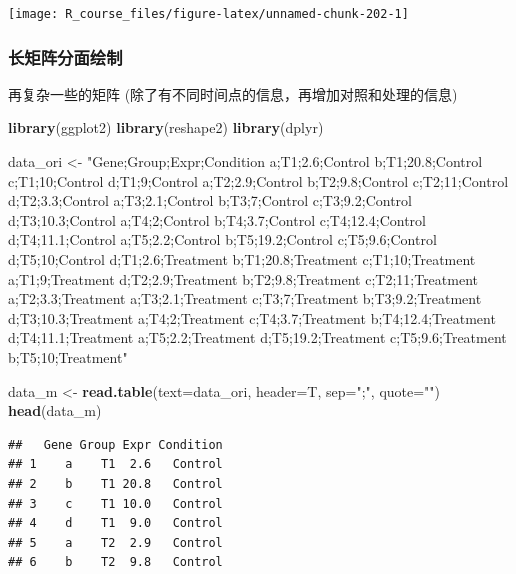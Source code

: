 \documentclass[]{article}
\newenvironment{Shaded}{\begin{snugshade}}{\end{snugshade}}
\newcommand{\KeywordTok}[1]{\textcolor[rgb]{0.13,0.29,0.53}{\textbf{{#1}}}}
\newcommand{\DataTypeTok}[1]{\textcolor[rgb]{0.13,0.29,0.53}{{#1}}}
\newcommand{\StringTok}[1]{\textcolor[rgb]{0.31,0.60,0.02}{{#1}}}
\newcommand{\NormalTok}[1]{{#1}}
\numberwithin{figure}{section}
\numberwithin{table}{section}
\theoremstyle{definition}
\theoremstyle{definition}
\theoremstyle{definition}
\theoremstyle{remark}
\begin{document}
\begin{center}\texttt{[image: R\_course\_files/figure-latex/unnamed-chunk-202-1]} \end{center}

\subsubsection{长矩阵分面绘制}

再复杂一些的矩阵 (除了有不同时间点的信息，再增加对照和处理的信息)

\begin{Shaded}
\begin{Highlighting}[]
\KeywordTok{library}\NormalTok{(ggplot2)}
\KeywordTok{library}\NormalTok{(reshape2)}
\KeywordTok{library}\NormalTok{(dplyr)}

\NormalTok{data_ori <-}\StringTok{ "Gene;Group;Expr;Condition}
\StringTok{a;T1;2.6;Control}
\StringTok{b;T1;20.8;Control}
\StringTok{c;T1;10;Control}
\StringTok{d;T1;9;Control}
\StringTok{a;T2;2.9;Control}
\StringTok{b;T2;9.8;Control}
\StringTok{c;T2;11;Control}
\StringTok{d;T2;3.3;Control}
\StringTok{a;T3;2.1;Control}
\StringTok{b;T3;7;Control}
\StringTok{c;T3;9.2;Control}
\StringTok{d;T3;10.3;Control}
\StringTok{a;T4;2;Control}
\StringTok{b;T4;3.7;Control}
\StringTok{c;T4;12.4;Control}
\StringTok{d;T4;11.1;Control}
\StringTok{a;T5;2.2;Control}
\StringTok{b;T5;19.2;Control}
\StringTok{c;T5;9.6;Control}
\StringTok{d;T5;10;Control}
\StringTok{d;T1;2.6;Treatment}
\StringTok{b;T1;20.8;Treatment}
\StringTok{c;T1;10;Treatment}
\StringTok{a;T1;9;Treatment}
\StringTok{d;T2;2.9;Treatment}
\StringTok{b;T2;9.8;Treatment}
\StringTok{c;T2;11;Treatment}
\StringTok{a;T2;3.3;Treatment}
\StringTok{a;T3;2.1;Treatment}
\StringTok{c;T3;7;Treatment}
\StringTok{b;T3;9.2;Treatment}
\StringTok{d;T3;10.3;Treatment}
\StringTok{a;T4;2;Treatment}
\StringTok{c;T4;3.7;Treatment}
\StringTok{b;T4;12.4;Treatment}
\StringTok{d;T4;11.1;Treatment}
\StringTok{a;T5;2.2;Treatment}
\StringTok{d;T5;19.2;Treatment}
\StringTok{c;T5;9.6;Treatment}
\StringTok{b;T5;10;Treatment"}

\NormalTok{data_m <-}\StringTok{ }\KeywordTok{read.table}\NormalTok{(}\DataTypeTok{text=}\NormalTok{data_ori, }\DataTypeTok{header=}\NormalTok{T, }\DataTypeTok{sep=}\StringTok{";"}\NormalTok{, }\DataTypeTok{quote=}\StringTok{""}\NormalTok{)}
\KeywordTok{head}\NormalTok{(data_m)}
\end{Highlighting}
\end{Shaded}

\begin{verbatim}
##   Gene Group Expr Condition
## 1    a    T1  2.6   Control
## 2    b    T1 20.8   Control
## 3    c    T1 10.0   Control
## 4    d    T1  9.0   Control
## 5    a    T2  2.9   Control
## 6    b    T2  9.8   Control
\end{verbatim}
\end{document}
